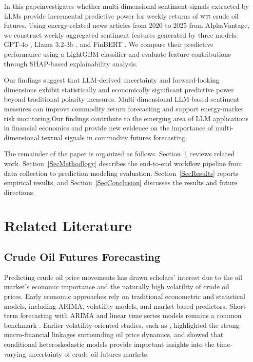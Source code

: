 \documentclass[preprint,12pt,authoryear]{elsarticle}
\newcommand{\wti}{\textsc{wti}}
\newcommand{\gpt}{GPT-4o }
\newcommand{\llama}{Llama 3.2-3b }
\newcommand{\finbert}{FinBERT }
\begin{document}
In this papeinvestigates whether multi-dimensional sentiment signals extracted by LLMs provide incremental predictive power for weekly returns of \wti{} crude oil futures. Using energy-related news articles from 2020 to 2025 from AlphaVantage, we construct weekly aggregated sentiment features generated by three models: \gpt, \llama, and \finbert. We compare their predictive performance using a LightGBM classifier and evaluate feature contributions through SHAP-based explainability analysis.



Our findings suggest that LLM-derived uncertainty and forward-looking dimensions exhibit statistically and economically significant predictive power beyond traditional polarity measures. Multi-dimensional
LLM-based sentiment measures can improve commodity return forecasting
and support energy-market risk monitoring.Our findings contribute to the emerging area of LLM applications in financial economics and provide new evidence on the importance of multi-dimensional textual signals in commodity futures forecasting.


The remainder of the paper is organized as follows. Section~\ref{SecLiterature} reviews related work. Section~\ref{SecMethodlogy} describes the end-to-end workflow pipeline from data collection to prediction modeling evaluation. Section~\ref{SecResults} reports empirical results, and Section~\ref{SecConclusion} discusses the results and future directions.




\section{Related Literature}
\label{SecLiterature}


\subsection{Crude Oil Futures Forecasting}

Predicting crude oil price movements has drawn scholars' interest due to the oil market’s economic importance and the naturally high volatility of crude oil prices. Early economic approaches rely on traditional econometric and statistical models, including ARIMA, volatility models, and market-based predictors. Short-term forecasting with ARIMA and linear time series models remains a common benchmark \citep{xiang2013application, nasir2023new}. Earlier volatility-oriented studies, such as \citet{cunado_oil_2005}, highlighted the strong macro-financial linkages surrounding oil price dynamics, and \citet{agnolucci2009volatility} showed that conditional heteroskedastic models provide important insights into the time-varying uncertainty of crude oil futures markets. 
\end{document}
